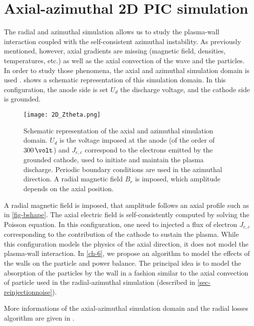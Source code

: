 
\section{Axial-azimuthal \acs{2D} \acs{PIC} simulation}
  \label{sec-axial-azimuthal}
  
  The radial and azimuthal simulation allows us to study the plasma-wall interaction coupled with the self-consistent azimuthal instability.
  As previously mentioned, however, axial gradients are missing (magnetic field, densities, temperatures, etc.) as well as the axial convection of the wave and the particles.
  In order to study those phenomena, the axial and azimuthal simulation domain is used \citep{adam2004,coche2014,lafleur2018,boeuf2018}.
   shows a schematic representation of this simulation domain.
  In this configuration, the anode side is set $U_d$ the discharge voltage, and the cathode side is grounded.
  
  
  
  \begin{figure}[hbt]
    \centering
    \texttt{[image: 2D\_Ztheta.png]}
    \caption{Schematic representation of the axial and azimuthal simulation domain. $U_d$ is the voltage imposed at the anode (of the order of $300\,\volt$) and $J_{e,c}$ correspond to the electrons emitted by the grounded cathode, used to initiate and maintain the plasma discharge. Periodic boundary conditions are used in the azimuthal direction. A radial magnetic field $B_r$ is imposed, which amplitude depends on the axial position. }
    \label{fig-2Dz}
  \end{figure}
  A radial magnetic field is imposed, that amplitude follows an axial profile such as in \cref{fig-bshape}.
  The axial electric field is self-consistently computed by solving the Poisson equation.
  In this configuration, one need to injected a flux of electron $J_{e,c}$ corresponding to the contribution of the cathode to sustain the plasma.
  While this configuration models the physics of the axial direction, it does not model the plasma-wall interaction.
  In \cref{ch-6}, we propose an algorithm to model the effects of the walls on the particle and power balance.
  The principal idea is to model the absorption  of the particles by the wall in a fashion similar to the axial convection of particle used in the radial-azimuthal simulation (described in \cref{sec-reinjectionnoise}).
  
  More informations of the axial-azimuthal simulation domain and the radial losses algorithm are given in .
  
  